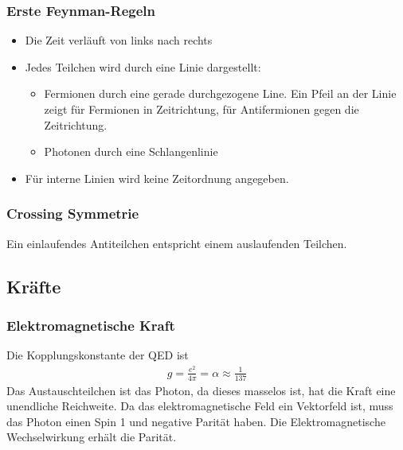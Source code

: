 \documentclass[final]{summery_5.0}
\begin{document}
\subsubsection{Erste Feynman-Regeln}
\begin{itemize}
    \item Die Zeit verläuft von links nach rechts 
    \item Jedes Teilchen wird durch eine Linie dargestellt:
    \begin{itemize}
        \item Fermionen durch eine gerade durchgezogene Line. Ein Pfeil an der Linie zeigt für Fermionen in Zeitrichtung, für Antifermionen gegen die Zeitrichtung.
        \item Photonen durch eine Schlangenlinie
    \end{itemize}
    \item Für interne Linien wird keine Zeitordnung angegeben. 
\end{itemize}

\subsubsection{Crossing Symmetrie}
Ein einlaufendes Antiteilchen entspricht einem auslaufenden Teilchen.

\subsection{Kräfte}
\subsubsection{Elektromagnetische Kraft}
Die Kopplungskonstante der QED ist 
\begin{align*}
    g = \frac{e^2}{4\pi} = \alpha \approx \frac1{137}
\end{align*}
Das Austauschteilchen ist das Photon, da dieses masselos ist, hat die Kraft eine unendliche Reichweite. Da das elektromagnetische Feld ein Vektorfeld ist, muss das Photon einen Spin 1 und negative Parität haben. Die Elektromagnetische Wechselwirkung erhält die Parität.
\end{document}
